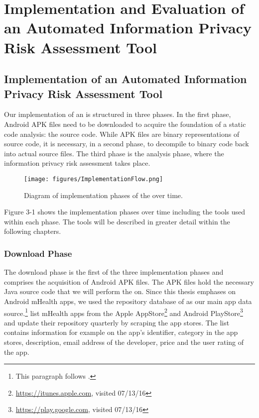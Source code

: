 \section{Implementation and Evaluation of an Automated Information Privacy Risk Assessment Tool}

\subsection{Implementation of an Automated Information Privacy Risk Assessment Tool}

Our implementation of an \aiprat is structured in three phases.
In the first phase, Android APK files need to be downloaded to acquire the foundation of a static code analysis: the source code.
While APK files are binary representations of source code, it is necessary, in a second phase, to decompile to binary code back into actual source files.
The third phase is the analysis phase, where the information privacy risk assessment takes place.

\begin{figure}[h]
	\label{fig:implementationPhases}
	\centering
	\texttt{[image: figures/ImplementationFlow.png]}
	\caption{Diagram of implementation phases of the \aiprat over time.}
\end{figure}

Figure 3-1 shows the implementation phases over time including the tools used within each phase. 
The tools will be described in greater detail within the following chapters.

\subsubsection{Download Phase}

The download phase is the first of the three implementation phases and comprises the acquisition of Android APK files. 
The APK files hold the necessary Java source code that we will perform the \sca on.
Since this thesis emphases on Android mHealth apps, we used the repository database of \cite{Xu2015} as our main app data source.\footnote{This paragraph follows \cite{Xu2015}.}
\cite{Xu2015} list mHealth apps from the Apple AppStore\footnote{\url{https://itunes.apple.com}, visited 07/13/16} and Android PlayStore\footnote{\url{https://play.google.com}, visited 07/13/16} and update their repository quarterly by scraping the app stores.
The list contains information for example on the app's identifier, category in the app stores, description, email address of the developer, price and the user rating of the app.

